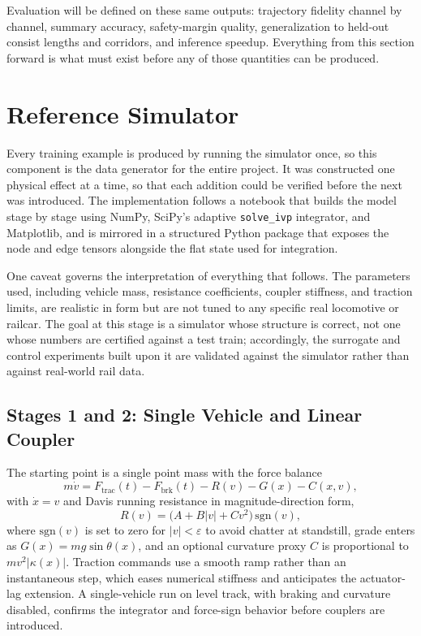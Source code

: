\documentclass[numbered]{trbunofficial}
\begin{document}
Evaluation will be defined on these same outputs: trajectory fidelity channel by channel, summary accuracy, safety-margin quality, generalization to held-out consist lengths and corridors, and inference speedup. Everything from this section forward is what must exist before any of those quantities can be produced.

\section{Reference Simulator}\label{sec:refsim}

Every training example is produced by running the simulator once, so this component is the data generator for the entire project. It was constructed one physical effect at a time, so that each addition could be verified before the next was introduced. The implementation follows a notebook that builds the model stage by stage using NumPy, SciPy's adaptive \texttt{solve\_ivp} integrator, and Matplotlib, and is mirrored in a structured Python package that exposes the node and edge tensors alongside the flat state used for integration.

One caveat governs the interpretation of everything that follows. The parameters used, including vehicle mass, resistance coefficients, coupler stiffness, and traction limits, are realistic in form but are not tuned to any specific real locomotive or railcar. The goal at this stage is a simulator whose structure is correct, not one whose numbers are certified against a test train; accordingly, the surrogate and control experiments built upon it are validated against the simulator rather than against real-world rail data.

\subsection{Stages 1 and 2: Single Vehicle and Linear Coupler}

The starting point is a single point mass with the force balance
\begin{equation}
  m\dot{v} = F_{\mathrm{trac}}(t) - F_{\mathrm{brk}}(t) - R(v) - G(x) - C(x,v),
  \label{eq:stage1}
\end{equation}
with $\dot{x} = v$ and Davis running resistance in magnitude-direction form,
\begin{equation}
  R(v) = \bigl(A + B|v| + C v^2\bigr)\,\mathrm{sgn}(v),
  \label{eq:davis}
\end{equation}
where $\mathrm{sgn}(v)$ is set to zero for $|v| < \varepsilon$ to avoid chatter at standstill, grade enters as $G(x) = mg\sin\theta(x)$, and an optional curvature proxy $C$ is proportional to $m v^2 |\kappa(x)|$. Traction commands use a smooth ramp rather than an instantaneous step, which eases numerical stiffness and anticipates the actuator-lag extension. A single-vehicle run on level track, with braking and curvature disabled, confirms the integrator and force-sign behavior before couplers are introduced.
\end{document}
